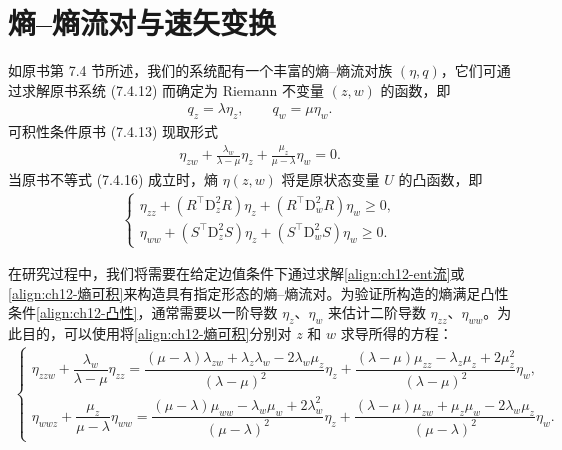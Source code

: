 \documentclass[../../main.tex]{subfiles}
\begin{document}
\section{熵--熵流对与速矢变换}\label{section:ch12-熵熵流对与速矢变换}

如原书第 7.4 节所述，我们的系统配有一个丰富的熵--熵流对族 $(\eta,q)$，它们可通过求解原书系统 (7.4.12) 而确定为 Riemann 不变量 $(z,w)$ 的函数，即
\begin{align}
q_z=\lambda\eta_z,\qquad q_w=\mu\eta_w.
\label{align:ch12-ent流}
\end{align}
可积性条件原书 (7.4.13) 现取形式
\begin{align}
\eta_{zw}+\frac{\lambda_w}{\lambda-\mu}\eta_z+\frac{\mu_z}{\mu-\lambda}\eta_w=0.
\label{align:ch12-熵可积}
\end{align}
当原书不等式 (7.4.16) 成立时，熵 $\eta(z,w)$ 将是原状态变量 $U$ 的凸函数，即
\begin{align}
\begin{cases}
\eta_{zz}+(R^{\top}\mathrm{D}^2_z R)\eta_z+(R^{\top}\mathrm{D}^2_w R)\eta_w\geqslant 0,\\
\eta_{ww}+(S^{\top}\mathrm{D}^2_z S)\eta_z+(S^{\top}\mathrm{D}^2_w S)\eta_w\geqslant 0.
\end{cases}
\label{align:ch12-凸性}
\end{align}

在研究过程中，我们将需要在给定边值条件下通过求解\eqref{align:ch12-ent流}或\eqref{align:ch12-熵可积}来构造具有指定形态的熵--熵流对。为验证所构造的熵满足凸性条件\eqref{align:ch12-凸性}，通常需要以一阶导数 $\eta_z$、$\eta_w$ 来估计二阶导数 $\eta_{zz}$、$\eta_{ww}$。为此目的，可以使用将\eqref{align:ch12-熵可积}分别对 $z$ 和 $w$ 求导所得的方程：
\begin{align}
\begin{cases}
\eta_{zzw}+\dfrac{\lambda_w}{\lambda-\mu}\eta_{zz}
=\dfrac{(\mu-\lambda)\lambda_{zw}+\lambda_z\lambda_w-2\lambda_w\mu_z}{(\lambda-\mu)^2}\eta_z
+\dfrac{(\lambda-\mu)\mu_{zz}-\lambda_z\mu_z+2\mu_z^2}{(\lambda-\mu)^2}\eta_w,\\[2mm]
\eta_{wwz}+\dfrac{\mu_z}{\mu-\lambda}\eta_{ww}
=\dfrac{(\mu-\lambda)\mu_{ww}-\lambda_w\mu_w+2\lambda_w^2}{(\mu-\lambda)^2}\eta_z
+\dfrac{(\lambda-\mu)\mu_{zw}+\mu_z\mu_w-2\lambda_w\mu_z}{(\mu-\lambda)^2}\eta_w.
\end{cases}
\label{align:ch12-熵二阶导数}
\end{align}
\end{document}

